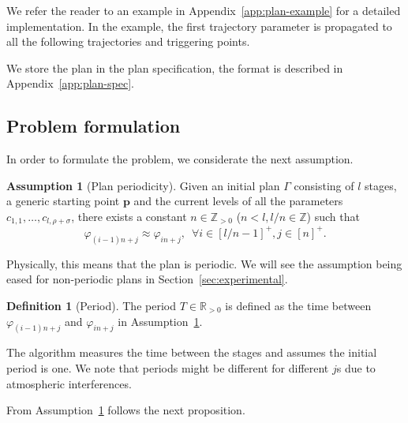 \documentclass[letterpaper,10pt,conference]{ieeeconf}
\theoremstyle{definition}
\newtheorem{assm}[thm]{Assumption}
\newtheorem{defn}{Definition}[section]
\begin{document}
We refer the reader to an example in Appendix~\ref{app:plan-example} for a detailed implementation. In the example, the first trajectory parameter is propagated to all the following trajectories and triggering points. 

We store the plan in the plan specification, the format is described in Appendix~\ref{app:plan-spec}. 

\subsection{Problem formulation}

In order to formulate the problem, we considerate the next assumption.

\begin{assm}[Plan periodicity]\label{assm:periodic}
  Given an initial plan $\Gamma$ consisting of $l$ stages, a generic starting point $\mathbf{p}$ and the current levels of all the parameters $c_{1,1},\dots,c_{l,\rho+\sigma}$, there exists a constant $n\in\mathbb{Z}_{>0}$ ($n<l,l/n\in\mathbb{Z}$) such that
  \begin{equation*}
    \varphi_{(i-1)n+j}\approx \varphi_{in+j},\,\,\,\forall i\in[l/n-1]^+,j\in[n]^+.
  \end{equation*}
\end{assm}

Physically, this means that the plan is periodic. We will see the assumption being eased for non-periodic plans in Section~\ref{sec:experimental}.

\begin{defn}[Period]\label{def:period}
  The period $T\in\mathbb{R}_{> 0}$ is defined as the time between $\varphi_{(i-1)n+j}$ and $\varphi_{in+j}$ in Assumption~\ref{assm:periodic}.
\end{defn}

The algorithm measures the time between the stages and assumes the initial period is one. We note that periods might be different for different $j$s due to atmospheric interferences. 

From Assumption~\ref{assm:periodic} follows the next proposition.
\end{document}
